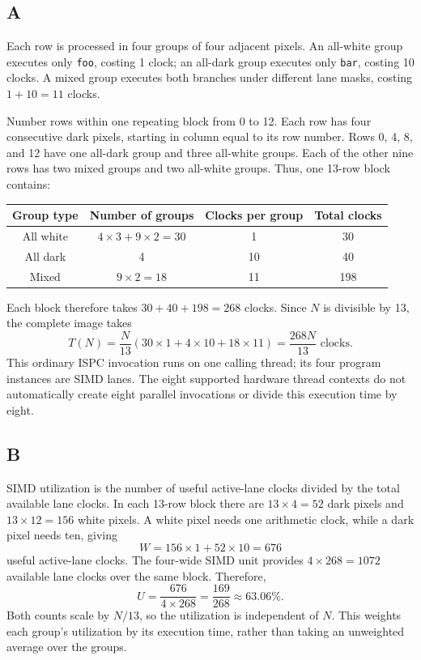 \documentclass[letterpaper,12pt]{article}
\newenvironment{answer}{\par}{\par\medskip}
\begin{document}
\subsection*{A}
\begin{answer}
Each row is processed in four groups of four adjacent pixels. An all-white
group executes only \texttt{foo}, costing 1 clock; an all-dark group
executes only \texttt{bar}, costing 10 clocks. A mixed group executes both
branches under different lane masks, costing $1+10=11$ clocks.

Number rows within one repeating block from 0 to 12. Each row has four
consecutive dark pixels, starting in column equal to its row number.
Rows 0, 4, 8, and 12 have one all-dark group and three all-white groups.
Each of the other nine rows has two mixed groups and two all-white groups.
Thus, one 13-row block contains:

\begin{center}
\begin{tabular}{c|c|c|c}
  Group type & Number of groups & Clocks per group & Total clocks \\
  \hline
  All white & $4\times3+9\times2=30$ & 1 & 30 \\
  All dark & 4 & 10 & 40 \\
  Mixed & $9\times2=18$ & 11 & 198
\end{tabular}
\end{center}

Each block therefore takes $30+40+198=268$ clocks. Since $N$ is divisible
by 13, the complete image takes
\[
  T(N)=\frac{N}{13}\left(30\times1+4\times10+18\times11\right)
      =\boxed{\frac{268N}{13}\text{ clocks}}.
\]
This ordinary ISPC invocation runs on one calling thread; its four
program instances are SIMD lanes. The eight supported hardware thread
contexts do not automatically create eight parallel invocations or
divide this execution time by eight.
\end{answer}

\subsection*{B}
\begin{answer}
SIMD utilization is the number of useful active-lane clocks divided by
the total available lane clocks. In each 13-row block there are
$13\times4=52$ dark pixels and $13\times12=156$ white pixels. A white
pixel needs one arithmetic clock, while a dark pixel needs ten, giving
\[
  W=156\times1+52\times10=676
\]
useful active-lane clocks. The four-wide SIMD unit provides
$4\times268=1072$ available lane clocks over the same block. Therefore,
\[
  U=\frac{676}{4\times268}
   =\frac{169}{268}
   \approx\boxed{63.06\%}.
\]
Both counts scale by $N/13$, so the utilization is independent of $N$.
This weights each group's utilization by its execution time, rather
than taking an unweighted average over the groups.
\end{answer}
\end{document}
